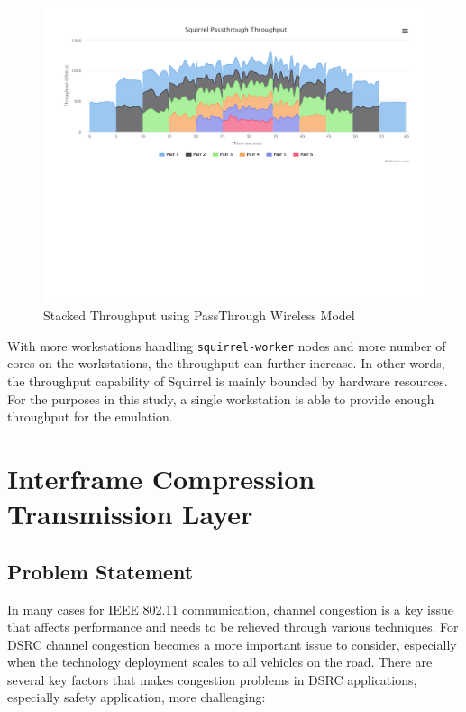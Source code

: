 \documentclass[12pt]{report}
\begin{document}
\begin{figure}[h]
  \includegraphics[width=\textwidth]{figures/results/passthrough.pdf}
  \caption{\label{fig:passthrough}Stacked Throughput using PassThrough Wireless Model}
\end{figure}

With more workstations handling \texttt{squirrel-worker} nodes and more number of cores on the workstations, the throughput can further increase. In other words, the throughput capability of Squirrel is mainly bounded by hardware resources. For the purposes in this study, a single workstation is able to provide enough throughput for the emulation.

\chapter{Interframe Compression Transmission Layer}

\section{Problem Statement}
\label{sec:problem_congestion}

In many cases for IEEE 802.11 communication, channel congestion is a key issue that affects performance and needs to be relieved through various techniques. For DSRC channel congestion becomes a more important issue to consider, especially when the technology deployment scales to all vehicles on the road. There are several key factors that makes congestion problems in DSRC applications, especially safety application, more challenging:
\end{document}
